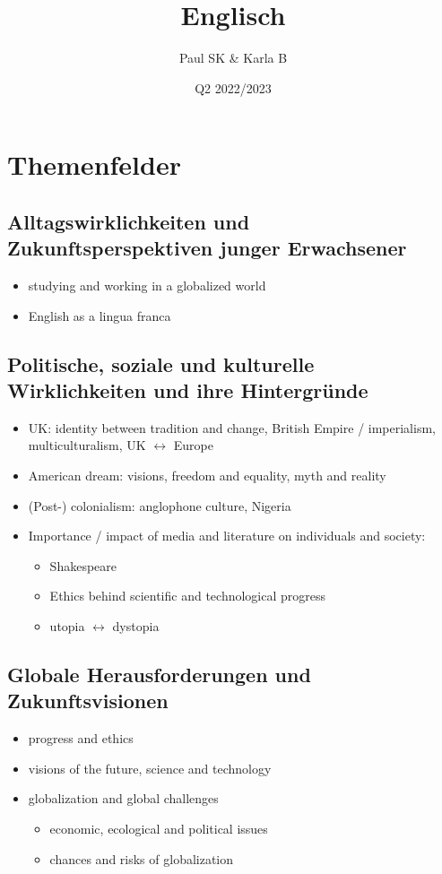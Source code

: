 \documentclass{article}
\title{Englisch}
\date{Q2 2022/2023}
\author{Paul SK \& Karla B}
\begin{document}
	\maketitle
	\newpage


	\section{Themenfelder}

	\subsection{Alltagswirklichkeiten und Zukunftsperspektiven junger Erwachsener}
	\begin{itemize}
		\item studying and working in a globalized world
		\item English as a lingua franca
	\end{itemize}

	\subsection{Politische, soziale und kulturelle Wirklichkeiten und ihre Hintergründe}
	\begin{itemize}
		\item UK: identity between tradition and change, British Empire / imperialism, multiculturalism, UK $\leftrightarrow$ Europe
		\item American dream: visions, freedom and equality, myth and reality
		\item (Post-) colonialism: anglophone culture, Nigeria
		\item Importance / impact of media and literature on individuals and society:
		\begin{itemize}
			\item Shakespeare
			\item Ethics behind scientific and technological progress
			\item utopia $\leftrightarrow$ dystopia
		\end{itemize}
	\end{itemize}

	\subsection{Globale Herausforderungen und Zukunftsvisionen}
	\begin{itemize}
		\item progress and ethics
		\item visions of the future, science and technology
		\item globalization and global challenges
		\begin{itemize}
			\item economic, ecological and political issues
			\item chances and risks of globalization
		\end{itemize}
	\end{itemize}
\end{document}
